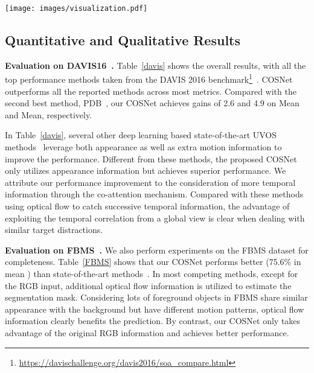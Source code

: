 \documentclass[10pt,twocolumn,letterpaper]{article}
\begin{document}
\begin{figure*}[t!]
	\centering
	\texttt{[image: images/visualization.pdf]}
	\caption{\small Qualitative results on three datasets (\S\ref{sec:qqr}). From top to bottom: \textit{dance-twirl} from the DAVIS16 dataset~\cite{perazzi2016benchmark}, \textit{horses05} from the FBMS dataset~\cite{DBLP:journals/pami/OchsMB14}, and \textit{bird0014} from the Youtube-Objects dataset~\cite{DBLP:conf/cvpr/PrestLCSF12}. }
	\label{qualitative}
\vspace{-6pt}
\end{figure*}
\subsection{Quantitative and Qualitative Results}\label{sec:qqr}
\noindent\textbf{Evaluation on DAVIS16~\cite{perazzi2016benchmark}.} Table~\ref{davis} shows the overall results, with all the top performance methods taken from the DAVIS 2016 benchmark\footnote{\scriptsize{\url{https://davischallenge.org/davis2016/soa_compare.html}}}~\cite{perazzi2016benchmark}. COSNet outperforms all the reported methods across most metrics. Compared with the second best method, PDB~\cite{Song_2018_ECCV}, our COSNet achieves gains of 2.6 and 4.9 on  Mean and   Mean, respectively. 

In Table~\ref{davis}, several other deep learning based state-of-the-art UVOS methods~\cite{cheng2017segflow,DBLP:conf/cvpr/TokmakovAS17,jain2017fusionseg,DBLP:conf/iccv/TokmakovAS17,Li_2018_ECCV1}
leverage both appearance as well as extra motion information to improve the performance. Different from these methods, the proposed COSNet only utilizes appearance information  but achieves superior performance. We attribute our performance improvement to the consideration of more temporal information through the co-attention mechanism. Compared with these methods using optical flow to catch successive temporal information,  the advantage of exploiting the temporal correlation from a global view is clear when dealing with similar target distractions.









\noindent\textbf{Evaluation on FBMS~\cite{DBLP:journals/pami/OchsMB14}.} We also perform experiments on the FBMS dataset for completeness. Table~\ref{FBMS} shows that our COSNet performs better (75.6\% in mean ) than state-of-the-art methods~\cite{DBLP:conf/bmvc/FaktorI14,DBLP:conf/iccv/PapazoglouF13,jain2017fusionseg,hu2018unsupervised,DBLP:conf/cvpr/KohK17,Li_2018_CVPR,Li_2018_ECCV1,Song_2018_ECCV,cheng2017segflow}.  In most competing methods, except for the RGB input, additional optical flow information is utilized to estimate the segmentation mask. Considering lots of foreground objects in FBMS share similar appearance with the background but have different motion patterns, optical flow information clearly benefits the prediction.  By contrast, our COSNet only takes advantage of the original RGB information and achieves better performance.
\end{document}
